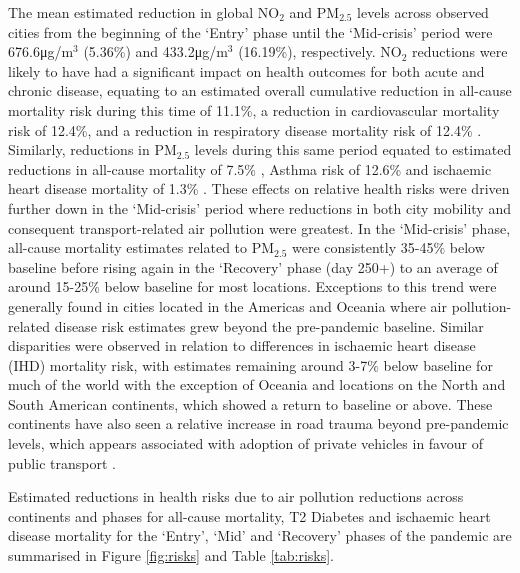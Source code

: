 \documentclass[preprint,10pt]{elsarticle} %
\begin{document}
The mean estimated reduction in global NO$_{2}$ and PM$_{2.5}$ levels across observed cities from the beginning of the `Entry' phase until the `Mid-crisis' period were 676.6\si{\micro\gram}/m$^{3}$ (5.36\%) and 433.2\si{\micro\gram}/m$^{3}$ (16.19\%), respectively. NO$_{2}$ reductions were likely to have had a significant impact on health outcomes for both acute and chronic disease, equating to an estimated overall cumulative reduction in all-cause mortality risk during this time of 11.1\%, a reduction in cardiovascular mortality risk of 12.4\%, and a reduction in respiratory disease mortality risk of 12.4\% \cite{Huang19Pollution}. Similarly, reductions in PM$_{2.5}$ levels during this same period equated to estimated reductions in all-cause mortality of 7.5\% \cite{Yu2020PM2.5}, Asthma risk of 12.6\% and ischaemic heart disease mortality of 1.3\% \cite{Xie257}. These effects on relative health risks were driven further down in the `Mid-crisis' period where reductions in both city mobility and consequent transport-related air pollution were greatest. In the `Mid-crisis' phase, all-cause mortality estimates related to PM$_{2.5}$ were consistently 35-45$\%$ below baseline before rising again in the `Recovery' phase (day 250+) to an average of around 15-25$\%$ below baseline for most locations. Exceptions to this trend were generally found in cities located in the Americas and Oceania where air pollution-related disease risk estimates grew beyond the pre-pandemic baseline. Similar disparities were observed in relation to differences in ischaemic heart disease (IHD) mortality risk, with estimates remaining around 3-7$\%$ below baseline for much of the world with the exception of Oceania and locations on the North and South American continents, which showed a return to baseline or above. These continents have also seen a relative increase in road trauma beyond pre-pandemic levels, which appears associated with adoption of private vehicles in favour of public transport \cite{ITFRS, saladie2023back, DAS20211}. 


Estimated reductions in health risks due to air pollution reductions across continents and phases for all-cause mortality, T2 Diabetes and ischaemic heart disease mortality for the `Entry', `Mid' and `Recovery' phases of the pandemic are summarised in Figure \ref{fig:risks} and Table \ref{tab:risks}. 
\end{document}
